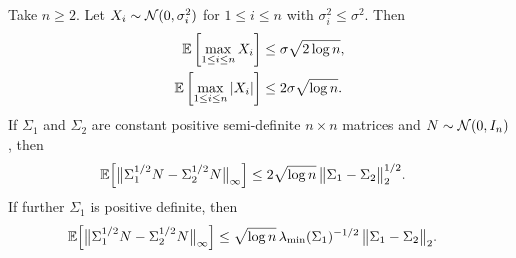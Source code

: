 \begin{lemma}
  \label{lem:kernel_app_gaussian_vector_maximal}

  Take $n \geq 2$.
  Let $X_i \sim \mathcal{N}(0, \sigma_i^2)$
  for $1 \leq i \leq n$
  with $\sigma_i^2 \leq \sigma^2$.
  Then
  \begin{align}
    \label{eq:kernel_app_gaussian_vector_maximal}
    \mathbb{E}\left[
      \max_{1 \leq i \leq n}
      X_i
    \right]
    &\leq
    \sigma \sqrt{2 \log n}, \\
    \label{eq:kernel_app_gaussian_vector_maximal_abs}
    \mathbb{E}\left[
      \max_{1 \leq i \leq n}
      |X_i|
    \right]
    &\leq
    2 \sigma \sqrt{\log n}.
  \end{align}
  If $\Sigma_1$ and $\Sigma_2$ are constant
  positive semi-definite $n \times n$ matrices
  and $N \sim \mathcal{N}(0,I_n)$,
  then
  \begin{align}
    \label{eq:kernel_app_gaussian_difference_psd}
    \mathbb{E}\Big[
      \big\|
      \Sigma_1^{1/2} N
      - \Sigma_2^{1/2} N
      \big\|_\infty
    \Big]
    &\leq
    2 \sqrt{\log n} \,
    \big\|
    \Sigma_1 - \Sigma_2
    \big\|_2^{1/2}.
  \end{align}
  If further $\Sigma_1$ is
  positive definite,
  then
  \begin{align}
    \label{eq:kernel_app_gaussian_difference_pd}
    \mathbb{E}\Big[
      \big\|
      \Sigma_1^{1/2} N
      - \Sigma_2^{1/2} N
      \big\|_\infty
    \Big]
    &\leq
    \sqrt{\log n} \,
    \lambda_{\min}(\Sigma_1)^{-1/2} \,
    \big\|
    \Sigma_1 - \Sigma_2
    \big\|_2.
  \end{align}

\end{lemma}

